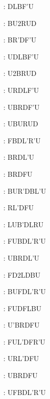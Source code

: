 \documentclass[9pt]{article}
\begin{document}
{\begin{multicols}{6}
: DLBF'U

: BU2RUD

: BR'DF'U

: UDLBF'U

: U2BRUD

: URDLF'U

: UBRDF'U

: UBURUD

: FBDL'R'U

: BRDL'U

: BRDFU

: BUR'DBL'U

: RL'DFU

: LUB'DLRU

: FUBDL'R'U

: UBRDL'U

: FD2LDBU

: BUFDL'R'U

: FUDFLBU

: U'BRDFU

: FUL'DFR'U

: URL'DFU

: UBRDFU

: UFBDL'R'U

\end{multicols}}
\end{document}

